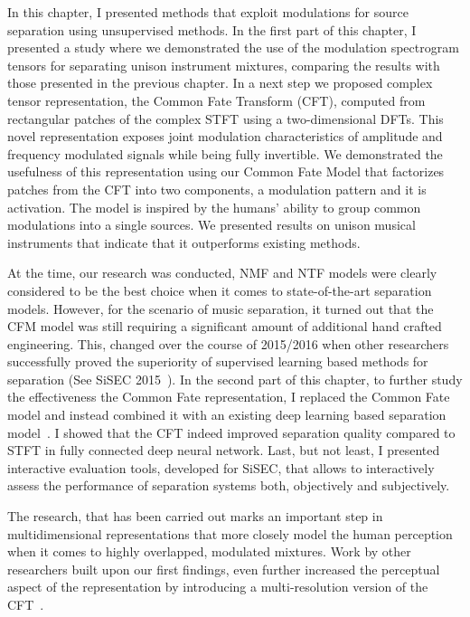 In this chapter, I presented methods that exploit modulations for source separation using unsupervised methods. 
In the first part of this chapter, I presented a study where we demonstrated the use of the modulation spectrogram tensors for separating unison instrument mixtures, comparing the results with those presented in the previous chapter.
In a next step we proposed complex tensor representation, the Common Fate Transform (CFT), computed from rectangular patches of the complex STFT using a two-dimensional DFTs.
This novel representation exposes joint modulation characteristics of amplitude and frequency modulated signals while being fully invertible.
We demonstrated the usefulness of this representation using our Common Fate Model that factorizes patches from the CFT into two components, a modulation pattern and it is activation. 
The model is inspired by the humans' ability to group common modulations into a single sources.
We presented results on unison musical instruments that indicate that it outperforms existing methods.
\par
At the time, our research was conducted, NMF and NTF models were clearly considered to be the best choice when it comes to state-of-the-art separation models. 
However, for the scenario of music separation, it turned out that the CFM model was still requiring a significant amount of additional hand crafted engineering.
This, changed over the course of 2015/2016 when other researchers successfully proved the superiority of supervised learning based methods for separation (See SiSEC 2015~\cite{ono15}).
In the second part of this chapter, to further study the effectiveness the Common Fate representation, I replaced the Common Fate model and instead combined it with an existing deep learning based separation model~\cite{uhlich15}.
I showed that the CFT indeed improved separation quality compared to  STFT in fully connected deep neural network.
Last, but not least, I presented interactive evaluation tools, developed for SiSEC, that allows to interactively assess the performance of separation systems both, objectively and subjectively.
\par
The research, that has been carried out marks an important step in multidimensional representations that more closely model the human perception when it comes to highly overlapped, modulated mixtures.
Work by other researchers built upon our first findings, even further increased the perceptual aspect of the representation by introducing a multi-resolution version of the CFT~\cite{seetharaman17, pishdadian17}.
